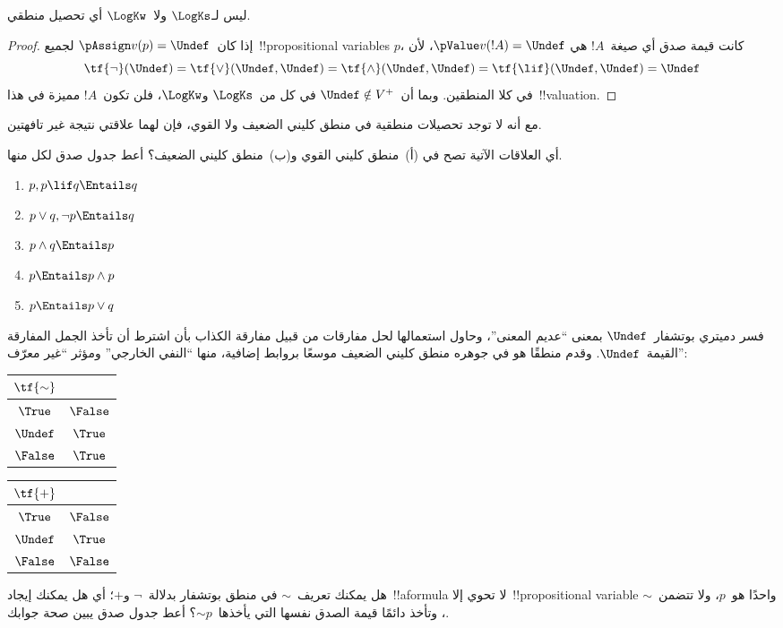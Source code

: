 \documentclass[../../../include/open-logic-section]{subfiles}
\begin{document}
\begin{prop}
  ليس لـ$\LogKs$ ولا~$\LogKw$ أي تحصيل منطقي.
\end{prop}

\begin{proof}
  إذا كان~$\pAssign v(p) = \Undef$ لجميع~!!{propositional variable}s
  $p$، كانت قيمة صدق أي صيغة~$!A$ هي
  $\pValue v(!A) = \Undef$، لأن
  \[
    \tf{\lnot}(\Undef) = \tf{\lor}(\Undef, \Undef) = \tf{\land}(\Undef,
  \Undef) = \tf{\lif}(\Undef, \Undef) = \Undef
  \]
  في كلا المنطقين. وبما أن~$\Undef \notin V^+$ في كل من~$\LogKs$
  و$\LogKw$، فلن تكون~$!A$ مميزة في هذا~!!{valuation}.
\end{proof}

مع أنه لا توجد تحصيلات منطقية في منطق كليني الضعيف ولا القوي، فإن
لهما علاقتي نتيجة غير تافهتين.

\begin{prob}
  أي العلاقات الآتية تصح في (أ)~منطق كليني القوي و(ب)~منطق كليني
  الضعيف؟ أعط جدول صدق لكل منها.
  \begin{enumerate}
    \item $p, p \lif q \Entails q$
    \item $p \lor q, \lnot p \Entails q$
    \item $p \land q \Entails p$
    \item $p \Entails p \land p$
    \item $p \Entails p \lor q$
  \end{enumerate}
\end{prob}

فسر دميتري بوتشفار~$\Undef$ بمعنى ``عديم المعنى''، وحاول استعمالها
لحل مفارقات من قبيل مفارقة الكذاب بأن اشترط أن تأخذ الجمل المفارقة
القيمة~$\Undef$. وقدم منطقًا هو في جوهره منطق كليني الضعيف موسعًا
بروابط إضافية، منها ``النفي الخارجي'' ومؤثر ``غير معرّف'':
\begin{center}
  \begin{tabular}{c|c}
    $\tf{\sim}$ & \\
    \hline
    $\True$ & $\False$ \\
    $\Undef$ & $\True$ \\
    $\False$ & $\True$
  \end{tabular}
\quad
  \begin{tabular}{c|c}
    $\tf{+}$ & \\
    \hline
    $\True$ & $\False$ \\
    $\Undef$ & $\True$ \\
    $\False$ & $\False$
  \end{tabular}
\end{center}

\begin{prob}
  هل يمكنك تعريف~$\sim$ في منطق بوتشفار بدلالة~$\lnot$ و$+$؛ أي
  هل يمكنك إيجاد~!!a{formula} لا تحوي إلا~!!{propositional variable}
  واحدًا هو~$p$، ولا تتضمن~$\sim$، وتأخذ دائمًا قيمة الصدق نفسها التي
  يأخذها~$\mathord{\sim}p$؟ أعط جدول صدق يبين صحة جوابك.
\end{prob}
\end{document}
